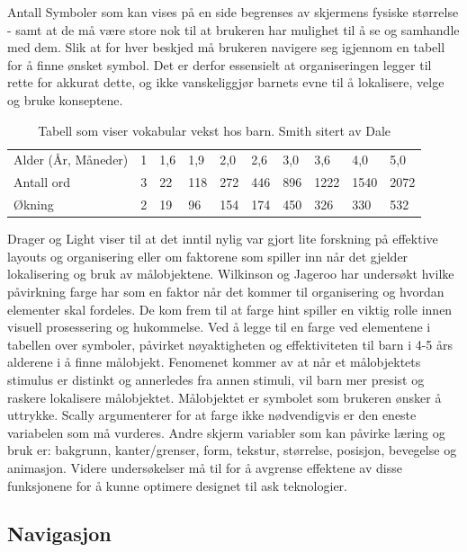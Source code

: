 \documentclass[phd,tocprelim]{cornell}
\begin{document}
Antall Symboler som kan vises på en side begrenses av skjermens fysiske størrelse - samt at de må være store nok til at brukeren har mulighet til å se  og samhandle med dem. Slik at for hver beskjed må brukeren navigere seg igjennom en tabell for å finne ønsket symbol. Det er derfor essensielt at organiseringen legger til rette for akkurat dette, og ikke vanskeliggjør barnets evne til å lokalisere, velge og bruke konseptene.

\begin{table}[h]
\begin{tabular}{llllllllll}
\hline
Alder (År, Måneder) & 1 & 1,6 & 1,9 & 2,0 & 2,6 & 3,0 & 3,6  & 4,0  & 5,0  \\ 
Antall ord          & 3 & 22  & 118 & 272 & 446 & 896 & 1222 & 1540 & 2072 \\ 
Økning              & 2 & 19  & 96  & 154 & 174 & 450 & 326  & 330  & 532  \\ \hline
\end{tabular}
\caption{Tabell som viser vokabular vekst hos barn.  Smith \cite{Smith} sitert av Dale \cite{Dale} }
\label{fig:BarnVak}
\end{table}



Drager og Light \cite{aac} viser til at det inntil nylig var gjort lite forskning på effektive layouts og organisering eller om faktorene som spiller inn når det gjelder lokalisering og bruk av målobjektene.  Wilkinson og Jageroo \cite{Wilkinson2006} har undersøkt hvilke påvirkning farge har som en faktor når det kommer til organisering og hvordan elementer skal fordeles. De kom frem til at farge hint spiller en viktig rolle innen visuell prosessering  og hukommelse. Ved å legge til en farge ved elementene i tabellen over symboler, påvirket nøyaktigheten og effektiviteten til barn i 4-5 års alderene i å finne målobjekt. Fenomenet  kommer av at når et målobjektets stimulus er distinkt og annerledes fra annen stimuli, vil barn mer presist og raskere lokalisere målobjektet. Målobjektet er symbolet som brukeren ønsker å uttrykke. Scally \cite{Scally} argumenterer for at farge ikke nødvendigvis er den eneste variabelen som må vurderes. Andre skjerm variabler som kan påvirke læring og bruk er: bakgrunn, kanter/grenser, form, tekstur, størrelse, posisjon, bevegelse og animasjon. Videre undersøkelser må til for å avgrense effektene av disse funksjonene for å kunne optimere designet til ask teknologier.


\subsection{Navigasjon}
\label{subsec:navigasjon}
\end{document}
